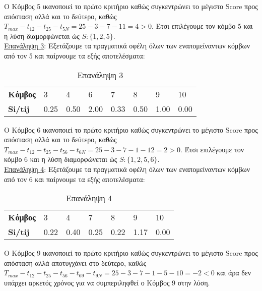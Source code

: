 \documentclass[12pt, a4paper]{article}
\begin{document}
Ο Κόμβος 5 ικανοποιεί το πρώτο κριτήριο καθώς συγκεντρώνει το μέγιστο Score προς απόσταση αλλά και το δεύτερο, καθώς  \( T_{max} - t_{12} - t_{25} - t_{5N} = 25 - 3 - 7 - 11 = 4 > 0\). Έτσι επιλέγουμε τον κόμβο 5 και η λύση διαμορφώνεται ώς \( S: \{1, 2,5\}\). \\

\underline{Επανάληψη 3}:  Εξετάζουμε τα πραγματικά οφέλη όλων των εναπομείναντων κόμβων από τον 5  και παίρνουμε τα εξής αποτελέσματα:

\begin{table}[h]
\centering
\begin{tabular}{l|l|l|l|l|l|l|l|}
\cline{2-8}
\textbf{Κόμβος} & 3 & 4 & 6 & 7 & 8 & 9 & 10 \\ \cline{2-8} 
\textbf{Si/tij} & 0.25 & 0.50 & 2.00 & 0.33 & 0.50 & 1.00 & 0.00 \\ \cline{2-8} 
\end{tabular}
\caption{Επανάληψη 3}
\label{my-label}
\end{table}

Ο Κόμβος 6 ικανοποιεί το πρώτο κριτήριο καθώς συγκεντρώνει το μέγιστο Score προς απόσταση αλλά και το δεύτερο, καθώς  \( T_{max} - t_{12} - t_{25} - t_{56} - t_{6N} = 25 - 3 - 7 - 1 - 12 = 2 > 0\). Έτσι επιλέγουμε τον κόμβο 6 και η λύση διαμορφώνεται ώς \( S: \{1, 2,5,6\}\). \\

\underline{Επανάληψη 4}:  Εξετάζουμε τα πραγματικά οφέλη όλων των εναπομείναντων κόμβων από τον 6  και παίρνουμε τα εξής αποτελέσματα:

\begin{table}[h]
\centering
\begin{tabular}{l|l|l|l|l|l|l|}
\cline{2-7}
\textbf{Κόμβος} & 3 & 4 & 7 & 8 & 9 & 10 \\ \cline{2-7} 
\textbf{Si/tij} & 0.22 & 0.40 & 0.25 & 0.22 & 1.17 & 0.00 \\ \cline{2-7} 
\end{tabular}
\caption{Επανάληψη 4}
\label{my-label}
\end{table}

Ο Κόμβος 9 ικανοποιεί το πρώτο κριτήριο καθώς συγκεντρώνει το μέγιστο Score προς απόσταση αλλά αποτυγχάνει στο δεύτερο, καθώς  \( T_{max} -t_{12} - t_{25} - t_{56}  - t_{69} - t_{9N} = 25 - 3 - 7 - 1 - 5 - 10 = -2 < 0\) και άρα δεν υπάρχει αρκετός χρόνος για να συμπεριληφθεί ο Κόμβος 9 στην λύση. 
\end{document}
